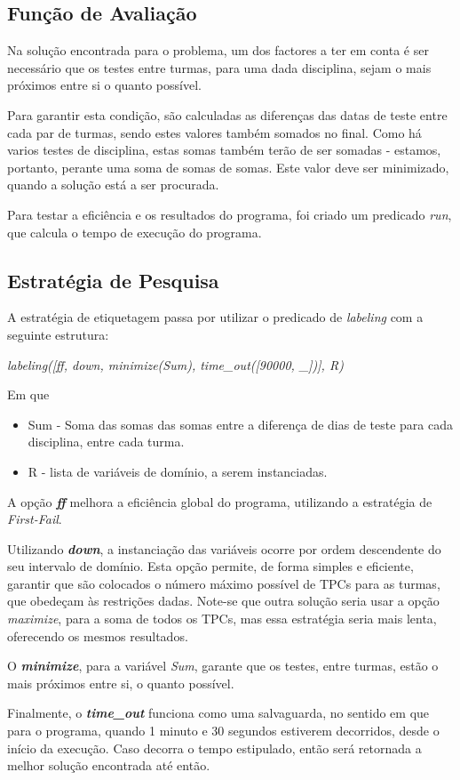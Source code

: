 \documentclass{llncs}
\begin{document}
\subsection{Função de Avaliação}
Na solução encontrada para o problema, um dos factores a ter em conta é ser necessário que os testes entre turmas, para uma dada disciplina, sejam o mais próximos entre si o quanto possível. \par
Para garantir esta condição, são calculadas as diferenças das datas de teste entre cada par de turmas, sendo estes valores também somados no final. Como há varios testes de disciplina, estas somas também terão de ser somadas - estamos, portanto, perante uma soma de somas de somas. Este valor deve ser minimizado, quando a solução está a ser procurada.\par
Para testar a eficiência e os resultados do programa, foi criado um predicado \textit{run}, que calcula o tempo de execução do programa.

\subsection{Estratégia de Pesquisa}
A estratégia de etiquetagem passa por utilizar o predicado de \textit{labeling} com a seguinte estrutura:\newline\newline
\centerline{\textit{labeling([ff, down, minimize(Sum), time\_out([90000, \_])], R)}}\newline
 
Em que
\begin{itemize}
\item Sum - Soma das somas das somas entre a diferença de dias de teste para cada disciplina, entre cada turma.
\item R - lista de variáveis de domínio, a serem instanciadas.
\end{itemize}
 
A opção \textit{\textbf{ff}} melhora a eficiência global do programa, utilizando a estratégia de \textit{First-Fail}.\par
Utilizando \textit{\textbf{down}}, a instanciação das variáveis ocorre por ordem descendente do seu intervalo de domínio. Esta opção permite, de forma simples e eficiente, garantir que são colocados o número máximo possível de TPCs para as turmas, que obedeçam às restrições dadas. Note-se que outra solução seria usar a opção \textit{maximize}, para a soma de todos os TPCs, mas essa estratégia seria mais lenta, oferecendo os mesmos resultados.\par
O \textit{\textbf{minimize}}, para a variável \textit{Sum}, garante que os testes, entre turmas, estão o mais próximos entre si, o quanto possível.\par
Finalmente, o \textit{\textbf{time\_out}} funciona como uma salvaguarda, no sentido em que para o programa, quando 1 minuto e 30 segundos estiverem decorridos, desde o início da execução. Caso decorra o tempo estipulado, então será retornada a melhor solução encontrada até então.
\end{document}

